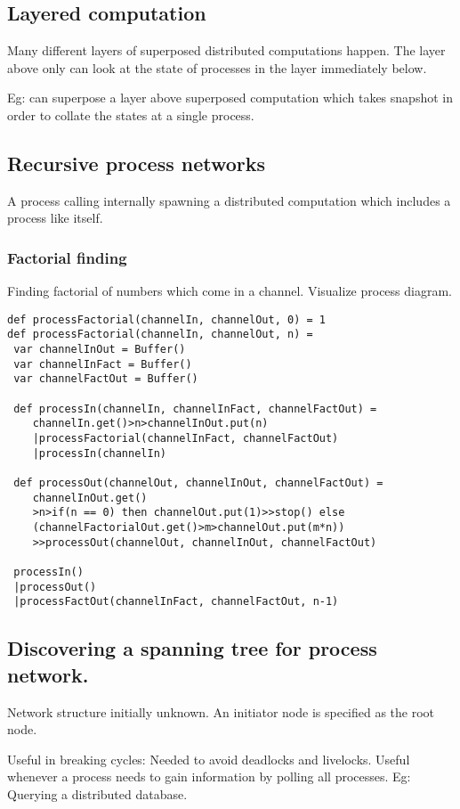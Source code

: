 \documentclass[oneside, article]{memoir}
\begin{document}
\subsection{Layered computation}
Many different layers of superposed distributed computations happen. The layer above only can look at the state of processes in the layer immediately below.

Eg: can superpose a layer above superposed computation which takes snapshot in order to collate the states at a single process.

\subsection{Recursive process networks}
A process calling internally spawning a distributed computation which includes a process like itself.

\subsubsection{Factorial finding}
Finding factorial of numbers which come in a channel. Visualize process diagram.
\begin{verbatim}
def processFactorial(channelIn, channelOut, 0) = 1
def processFactorial(channelIn, channelOut, n) = 
 var channelInOut = Buffer()
 var channelInFact = Buffer()
 var channelFactOut = Buffer()

 def processIn(channelIn, channelInFact, channelFactOut) =
    channelIn.get()>n>channelInOut.put(n)
    |processFactorial(channelInFact, channelFactOut)
    |processIn(channelIn)

 def processOut(channelOut, channelInOut, channelFactOut) = 
    channelInOut.get()
    >n>if(n == 0) then channelOut.put(1)>>stop() else 
    (channelFactorialOut.get()>m>channelOut.put(m*n))
    >>processOut(channelOut, channelInOut, channelFactOut)

 processIn()
 |processOut()
 |processFactOut(channelInFact, channelFactOut, n-1)
\end{verbatim}

\subsection{Discovering a spanning tree for process network.}
Network structure initially unknown. An initiator node is specified as the root node.

Useful in breaking cycles: Needed to avoid deadlocks and livelocks. Useful whenever a process needs to gain information by polling all processes. Eg: Querying a distributed database.
\end{document}
